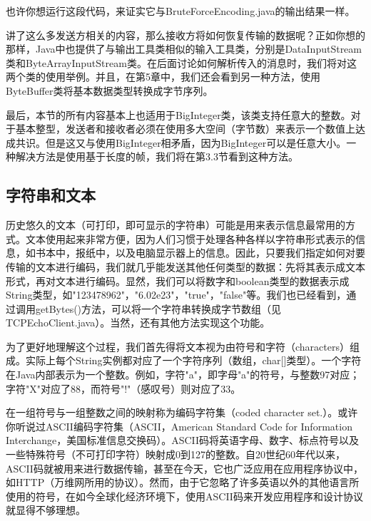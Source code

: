 		

		也许你想运行这段代码，来证实它与BruteForceEncoding.java的输出结果一样。 

		讲了这么多发送方相关的内容，那么接收方将如何恢复传输的数据呢？正如你想的那样，Java中也提供了与输出工具类相似的输入工具类，分别是DataInputStream类和ByteArrayInputStream类。在后面讨论如何解析传入的消息时，我们将对这两个类的使用举例。并且，在第5章中，我们还会看到另一种方法，使用ByteBuffer类将基本数据类型转换成字节序列。 

		最后，本节的所有内容基本上也适用于BigInteger类，该类支持任意大的整数。对于基本整型，发送者和接收者必须在使用多大空间（字节数）来表示一个数值上达成共识。但是这又与使用BigInteger相矛盾，因为BigInteger可以是任意大小。一种解决方法是使用基于长度的帧，我们将在第3.3节看到这种方法。 


	\subsection{字符串和文本} 

		历史悠久的文本（可打印，即可显示的字符串）可能是用来表示信息最常用的方式。文本使用起来非常方便，因为人们习惯于处理各种各样以字符串形式表示的信息，如书本中，报纸中，以及电脑显示器上的信息。因此，只要我们指定如何对要传输的文本进行编码，我们就几乎能发送其他任何类型的数据：先将其表示成文本形式，再对文本进行编码。显然，我们可以将数字和boolean类型的数据表示成String类型，如"123478962"，"6.02e23"，"true"，"false"等。我们也已经看到，通过调用getBytes()方法，可以将一个字符串转换成字节数组（见TCPEchoClient.java）。当然，还有其他方法实现这个功能。 

		为了更好地理解这个过程，我们首先得将文本视为由符号和字符（characters）组成。实际上每个String实例都对应了一个字符序列（数组，char[]类型）。一个字符在Java内部表示为一个整数。例如，字符"a"，即字母"a"的符号，与整数97对应；字符"X"对应了88，而符号"!"（感叹号）则对应了33。 

		在一组符号与一组整数之间的映射称为编码字符集（coded character set.）。或许你听说过ASCII编码字符集（ASCII，American Standard Code for Information Interchange，美国标准信息交换码）。ASCII码将英语字母、数字、标点符号以及一些特殊符号（不可打印字符）映射成0到127的整数。自20世纪60年代以来，ASCII码就被用来进行数据传输，甚至在今天，它也广泛应用在应用程序协议中，如HTTP（万维网所用的协议）。然而，由于它忽略了许多英语以外的其他语言所使用的符号，在如今全球化经济环境下，使用ASCII码来开发应用程序和设计协议就显得不够理想。 

